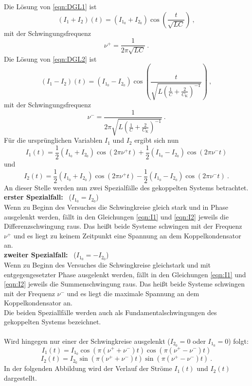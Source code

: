 Die Lösung von \ref{eqn:DGL1} ist
\begin{equation}
	(I_1 + I_2)(t) = (I_{1_0} + I_{2_0}) \cos \left(\frac{t}{\sqrt{LC}} \right) \ ,
\end{equation}
mit der Schwingungsfrequenz
\begin{equation}
	\nu^+ = \frac{1}{2 \pi \sqrt{LC}} \ .
	\label{eqn:vp}
\end{equation}
Die Lösung von \ref{eqn:DGL2} ist
\begin{equation}
	(I_1 - I_2)(t) = (I_{1_0} - I_{2_0}) \cos \left(\frac{t}{\sqrt{L \left(\frac{1}{C} + \frac{2}{C_\text{K}} \right)^{-1}}} \right) \ ,
\end{equation}
mit der Schwingungsfrequenz
\begin{equation}
\nu^- = \frac{1}{2 \pi \sqrt{L \left(\frac{1}{C} + \frac{2}{C_\text{K}} \right)^{-1}}} \ .
	\label{eqn:vm}
\end{equation}
Für die ursprünglichen Variablen $I_1$ und $I_2$ ergibt sich nun
\begin{equation}
	I_1(t) = \frac{1}{2}(I_{1_0} + I_{2_0}) \cos(2 \pi \nu^+ t) + \frac{1}{2}(I_{1_0} - I_{2_0}) \cos(2 \pi \nu^- t)
	\label{eqn:I1}
\end{equation}
und
\begin{equation}
	I_2(t) = \frac{1}{2}(I_{1_0} + I_{2_0}) \cos(2 \pi \nu^+ t) - \frac{1}{2}(I_{1_0} - I_{2_0}) \cos(2 \pi \nu^- t) \ .
	\label{eqn:I2}
\end{equation}
An dieser Stelle werden nun zwei Spezialfälle des gekoppelten Systems betrachtet. \\
\textbf{erster Spezialfall:} \ ($I_{1_0} = I_{2_0}$) \\
Wenn zu Beginn des Versuches die Schwingkreise gleich stark und in Phase ausgelenkt werden, fällt in den Gleichungen \ref{eqn:I1} und \ref{eqn:I2} jeweils die Differenzschwingung raus. Das heißt beide Systeme schwingen mit der Frequenz $\nu^+$ und es liegt zu keinem Zeitpunkt eine Spannung an dem Koppelkondensator an. \\
\textbf{zweiter Spezialfall:} \ ($I_{1_0} = -I_{2_0}$) \\
Wenn zu Beginn des Versuches die Schwingkreise gleichstark und mit entgegengesetzter Phase ausgelenkt werden, fällt in den Gleichungen \ref{eqn:I1} und \ref{eqn:I2} jeweils die Summenschwingung raus. Das heißt beide Systeme schwingen mit der Frequenz $\nu^-$ und es liegt die maximale Spannung an dem Koppelkondensator an. \\
Die beiden Speziallfälle werden auch als Fundamentalschwingungen des gekoppelten Systems bezeichnet.\\
\\
Wird hingegen nur einer der Schwingkreise ausgelenkt ($I_{2_0} = 0$ oder $I_{1_0} = 0$) folgt:
\begin{equation}
	I_1(t) = I_{1_0} \cos(\pi (\nu^+ + \nu^-)t) \cos(\pi (\nu^+ - \nu^-)t)
\end{equation}
\begin{equation}
	I_2(t) = I_{2_0} \sin(\pi (\nu^+ + \nu^-)t) \sin(\pi (\nu^+ - \nu^-)t) \ .
\end{equation}
In der folgenden Abbildung wird der Verlauf der Ströme $I_1(t)$ und $I_2(t)$ dargestellt.

